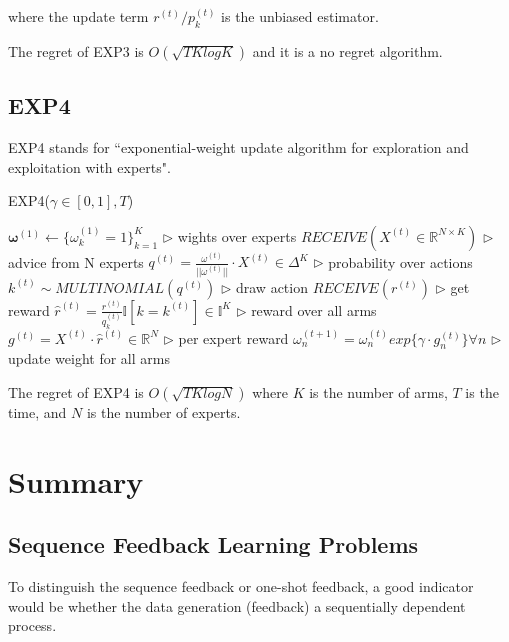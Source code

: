 \documentclass[11pt]{article}
\begin{document}
where the update term $r^{(t)}/p_k^{(t)}$ is the unbiased estimator.

The regret of EXP3 is $O(\sqrt{TK log K})$ and it is a no regret algorithm.

\subsection{EXP4}
EXP4 stands for ``exponential-weight update algorithm for exploration and exploitation with experts".

\begin{algorithm}
\caption{EXP4($\gamma \in [0,1], T$)}
\begin{algorithmic}[1]

\State $\mathbf{\omega}^{(1)} \leftarrow \{ \omega_k^{(1)} = 1\}_{k=1}^{K}$ \hfill $\triangleright$ wights over experts
        \State $RECEIVE(X^{(t)} \in \mathbb{R}^{N \times K})$ \hfill $\triangleright$ advice from N experts
        \State $q^{(t)} = \frac{\omega^{(t)}}{||\omega^{(t)}||} \cdot X^{(t)} \in \Delta^K$ \hfill $\triangleright$ probability over actions
        \State $k^{(t)} \sim MULTINOMIAL(q^{(t)})$ \hfill $\triangleright$ draw action
        \State $RECEIVE(r^{(t)})$ \hfill $\triangleright$ get reward
        \State $\hat{r}^{(t)} = \frac{r^{(t)}}{q_{k}^{(t)}} \mathbb{I}[k = k^{(t)}] \in \mathbb{I}^K$ \hfill $\triangleright$ reward over all arms
        \State $g^{(t)} = X^{(t)} \cdot \hat{r}^{(t)} \in \mathbb{R}^N$ \hfill $\triangleright$ per expert reward
        \State $\omega_{n}^{(t+1)} = \omega_{n}^{(t)} exp\{\gamma \cdot g_n^{(t)}\} \forall n$ \hfill $\triangleright$ update weight for all arms
    \EndFor
\end{algorithmic}
\end{algorithm}

The regret of EXP4 is $O(\sqrt{TK log N})$ where $K$ is the number of arms, $T$ is the time, and $N$ is the number of experts.

\section{Summary}

\subsection{Sequence Feedback Learning Problems}
To distinguish the sequence feedback or one-shot feedback, a good indicator would be whether the data generation (feedback) a sequentially dependent process.
\end{document}
